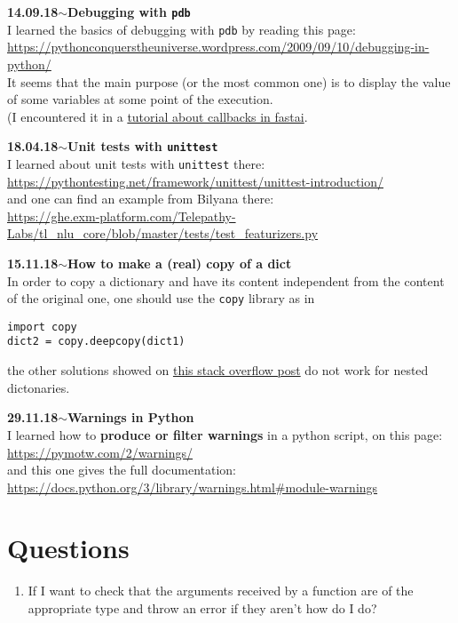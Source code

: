 \documentclass[11pt,a4paper]{article}
\newenvironment{loggentry}[2]%
{\noindent\textbf{#1}\hspace{1cm}$\mathbf{\sim}$\text{ }\textbf{#2}\\}{\vspace{0.5cm}}
\begin{document}
\begin{loggentry}{14.09.18}{Debugging with \texttt{pdb}}
I learned the basics of debugging with \texttt{pdb} by reading this page:\\
\url{https://pythonconquerstheuniverse.wordpress.com/2009/09/10/debugging-in-python/}\\
It seems that the main purpose (or the most common one) is to display the value of some variables at some point of the execution.\\
(I encountered it in a \href{https://github.com/sgugger/Deep-Learning/blob/master/Using%20the%20callback%20system%20in%20fastai.ipynb}{tutorial about callbacks in fastai}.\\
\end{loggentry}

\begin{loggentry}{18.04.18}{Unit tests with \texttt{unittest}}
I learned about unit tests with \texttt{unittest} there:\\
\url{https://pythontesting.net/framework/unittest/unittest-introduction/}\\
and one can find an example from Bilyana there:\\
\url{https://ghe.exm-platform.com/Telepathy-Labs/tl_nlu_core/blob/master/tests/test_featurizers.py}\\
\end{loggentry}

\begin{loggentry}{15.11.18}{How to make a (real) copy of a dict}
In order to copy a dictionary and have its content independent from the content of the original one, one should use the \texttt{copy} library as in
\begin{verbatim}
import copy
dict2 = copy.deepcopy(dict1)
\end{verbatim}
the other solutions showed on \href{https://stackoverflow.com/questions/2465921/how-to-copy-a-dictionary-and-only-edit-the-copy#2465932}{this stack overflow post} do not work for nested dictonaries.
\end{loggentry}

\begin{loggentry}{29.11.18}{Warnings in Python}
I learned how to \textbf{produce or filter warnings} in a python script, on this page:\\
\url{https://pymotw.com/2/warnings/}\\
and this one gives the full documentation:\\
\url{https://docs.python.org/3/library/warnings.html#module-warnings}\\
\end{loggentry}

\section{Questions}
\begin{enumerate}
\item If I want to check that the arguments received by a function are of the appropriate type and throw an error if they aren't how do I do?
\end{enumerate}
\end{document}
